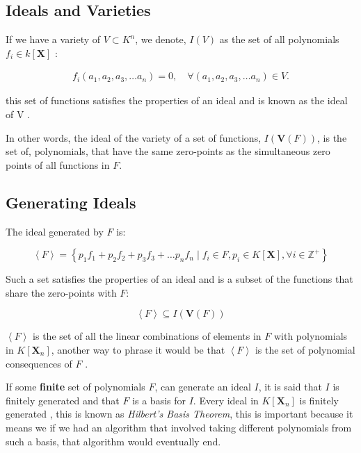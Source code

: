 \documentclass[a4paper,11pt,twoside]{article}
\begin{document}
\subsection{Ideals and Varieties}
\label{sec:orgee37aaf}
 If we have a variety of \(V \subset K^n\), we denote, \(I\left( V \right)\) as the set of all
polynomials \(f_i\in k\left[ \textbf{X} \right]\) : \cite[\S 1.1.3]{hibiGrobnerBasesStatistics2014}

\begin{align*}
      f_i\left( a_1, a_2, a_3, \ldots a_n \right) =0, \quad \forall \left( a_1, a_2, a_3, \ldots a_n \right) \in V
.\end{align*}


this set of functions satisfies the properties of an ideal and is known as the ideal of V \cite{coxIdealsVarietiesAlgorithms1997}.

In other words, the ideal of the variety of a set of functions,
\(I\left( \mathbf{V}\left(F\right) \right)\), is the set of,
polynomials, that have the same zero-points as the simultaneous zero
points of all functions in \(F\).

\subsection{Generating Ideals}
\label{sec:org143c380}
The ideal generated by \(F\) is:

\[
    \left\langle F\right\rangle =\left\{
    p_{1}f_{1}+p_{2}f_{2}+p_{3}f_{3}+\ldots p_{n}f_{n}\mid f_{i}\in
    F,p_{i}\in K\left[\boldsymbol{X}\right],\forall
    i\in\mathbb{Z}^{+}\right\}
    \]

Such a set satisfies the properties of an ideal and is a subset
of the functions that share the zero-points with \(F\): \cite[p. 34]{coxIdealsVarietiesAlgorithms1997}

\[
    \left\langle F \right\rangle \subseteq
    I\left(\boldsymbol{V}\left(F\right)\right)
    \]


\(\left\langle F \right\rangle\) is the set of all the linear combinations of elements in \(F\)
with polynomials in \(K\left[\mathbf{X}_n\right]\), another way
to phrase it would be that \(\left\langle F\right\rangle\) is the
set of polynomial consequences of \(F\) \cite[p. 30]{coxIdealsVarietiesAlgorithms1997}.

If some \textbf{finite} set of polynomials \(F\), can generate an ideal
\(I\), it is said that \(I\) is finitely generated and that \(F\)
is a basis for \(I\). Every ideal in
\(K\left[\mathbf{X}_n\right]\) is finitely generated
\cite[p. 77]{coxIdealsVarietiesAlgorithms1997}, this is known
as \emph{Hilbert's Basis Theorem}, this is important because it means we
if we had an algorithm that involved taking different polynomials
from such a basis, that algorithm would eventually end.
\end{document}
